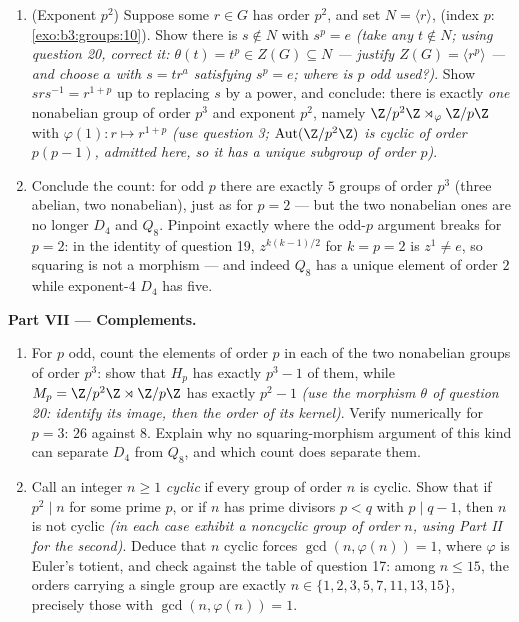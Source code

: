 \begin{problem}
\begin{enumerate}[resume]
  \item (Exponent $p^2$) Suppose some $r \in G$ has order $p^2$,
        and set $N = \langle r\rangle$,  (index $p$:
        \cref{exo:b3:groups:10}). Show there is $s \notin N$ with
        $s^p = e$ \emph{(take any $t \notin N$; using question
        20, correct it: $\theta(t) = t^p \in Z(G) \subseteq N$
        --- justify $Z(G) = \langle r^p\rangle$ --- and choose $a$
        with $s = tr^{a}$ satisfying $s^p = e$; where is $p$ odd
        used?)}. Show $srs^{-1} = r^{1+p}$ up to replacing $s$ by
        a power, and conclude: there is exactly \emph{one}
        nonabelian group of order $p^3$ and exponent $p^2$,
        namely $\Z/p^2\Z \rtimes_\varphi \Z/p\Z$ with
        $\varphi(1)\colon r \mapsto r^{1+p}$ \emph{(use question
        3; $\operatorname{Aut}(\Z/p^2\Z)$ is cyclic of order
        $p(p-1)$, admitted here, so it has a unique subgroup of
        order $p$)}.
  \item Conclude the count: for odd $p$ there are exactly $5$
        groups of order $p^3$ (three abelian, two nonabelian),
        just as for $p = 2$ --- but the two nonabelian ones are
        no longer $D_4$ and $Q_8$. Pinpoint exactly where the
        odd-$p$ argument breaks for $p = 2$: in the identity of
        question 19, $z^{k(k-1)/2}$ for $k = p = 2$ is $z^1 \neq
        e$, so squaring is not a morphism --- and indeed $Q_8$
        has a unique element of order $2$ while exponent-$4$
        $D_4$ has five.
\end{enumerate}

\medskip
\noindent\textbf{Part VII --- Complements.}
\begin{enumerate}[resume]
  \item For $p$ odd, count the elements of order $p$ in each of
        the two nonabelian groups of order $p^3$: show that
        $H_p$ has exactly $p^3 - 1$ of them, while $M_p =
        \Z/p^2\Z \rtimes \Z/p\Z$ has exactly $p^2 - 1$
        \emph{(use the morphism $\theta$ of question 20:
        identify its image, then the order of its kernel)}.
        Verify numerically for $p = 3$: $26$ against $8$.
        Explain why no squaring-morphism argument of this kind
        can separate $D_4$ from $Q_8$, and which count does
        separate them.
  \item Call an integer $n \geq 1$ \emph{cyclic} if every group
        of order $n$ is cyclic. Show that if $p^2 \mid n$ for
        some prime $p$, or if $n$ has prime divisors $p < q$
        with $p \mid q - 1$, then $n$ is not cyclic \emph{(in
        each case exhibit a noncyclic group of order $n$, using
        Part II for the second)}. Deduce that $n$ cyclic forces
        $\gcd(n, \varphi(n)) = 1$, where $\varphi$ is Euler's
        totient, and check against the table of question 17:
        among $n \leq 15$, the orders carrying a single group
        are exactly $n \in \{1, 2, 3, 5, 7, 11, 13, 15\}$,
        precisely those with $\gcd(n, \varphi(n)) = 1$.
\end{enumerate}
\end{problem}
